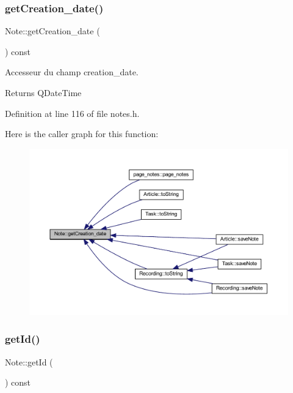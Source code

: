 \subsubsection{\texorpdfstring{get\+Creation\+\_\+date()}{getCreation\_date()}}
{\footnotesize\ttfamily Note\+::get\+Creation\+\_\+date (\begin{DoxyParamCaption}{ }\end{DoxyParamCaption}) const\hspace{0.3cm}{\ttfamily [inline]}}



Accesseur du champ creation\+\_\+date. 

\begin{DoxyReturn}{Returns}
Q\+Date\+Time 
\end{DoxyReturn}


Definition at line 116 of file notes.\+h.

Here is the caller graph for this function\+:\nopagebreak
\begin{figure}[H]
\begin{center}
\leavevmode
\includegraphics[width=350pt]{class_note_a89b9be4eae802c78a0959aa9bd408e41_icgraph}
\end{center}
\end{figure}
\mbox{\label{class_note_afafbebe4aa35b8d29d903bc53fa31929}} 
\subsubsection{\texorpdfstring{get\+Id()}{getId()}}
{\footnotesize\ttfamily Note\+::get\+Id (\begin{DoxyParamCaption}{ }\end{DoxyParamCaption}) const\hspace{0.3cm}{\ttfamily [inline]}}



